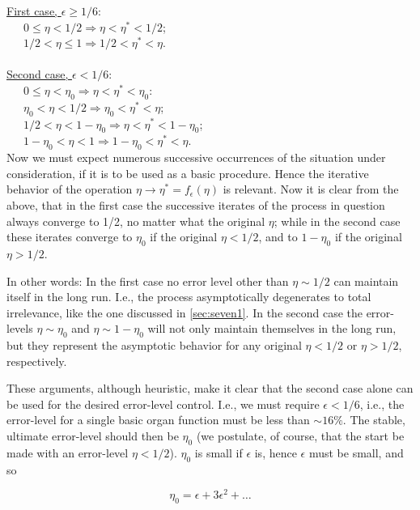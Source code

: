 \documentclass[twocolumn,preprintnumbers,amsmath,amssymb,floatfix]{revtex4}
\begin{document}
\underline{First case, $\epsilon\geq1/6$}:\\
\indent~~~$0\leq\eta<1/2 \Rightarrow \eta<\eta^*<1/2$;\\
\indent ~~~$1/2<\eta\leq1 \Rightarrow 1/2<\eta^*<\eta$.\\\\
\indent \underline{Second case, $\epsilon<1/6$}:\\
\indent ~~~$0\leq\eta<\eta_0 \Rightarrow \eta<\eta^*<\eta_0$:\\
\indent ~~~$\eta_0<\eta<1/2 \Rightarrow \eta_0<\eta^*<\eta$;\\
\indent ~~~$1/2<\eta<1-\eta_0 \Rightarrow \eta<\eta^*<1-\eta_0$;\\
\indent ~~~$1-\eta_0<\eta<1 \Rightarrow 1-\eta_0<\eta^*<\eta$.\\

Now we must expect numerous successive occurrences of the
situation under consideration, if it is to be used as a basic
procedure. Hence the iterative behavior of the operation
$\eta\rightarrow\eta^*=f_\epsilon(\eta)$ is relevant. Now it is
clear from the above, that in the first case the successive
iterates of the process in question always converge to 1/2, no
matter what the original $\eta$; while in the second case these
iterates converge to $\eta_0$ if the original $\eta<1/2$, and to
$1-\eta_0$ if the original $\eta>1/2$.

In other words: In the first case no error level other than
$\eta\sim1/2$ can maintain itself in the long run. I.e., the
process asymptotically degenerates to total irrelevance, like the
one discussed in \ref{sec:seven1}. In the second case the
error-levels $\eta\sim\eta_0$ and $\eta\sim1-\eta_0$ will not only
maintain themselves in the long run, but they represent the
asymptotic behavior for any original $\eta<1/2$ or $\eta>1/2$,
respectively.

These arguments, although heuristic, make it clear that the second
case alone can be used for the desired error-level control. I.e.,
we must require $\epsilon<1/6$, i.e., the error-level for a single
basic organ function must be less than $\sim 16 \%$. The stable,
ultimate error-level should then be $\eta_0$ (we postulate, of
course, that the start be made with an error-level $\eta<1/2$).
$\eta_0$ is small if $\epsilon$ is, hence $\epsilon$ must be
small, and so

\begin{equation}
\eta_0=\epsilon+3\epsilon^2+\ldots \label{eq:11}
\end{equation}
\end{document}
